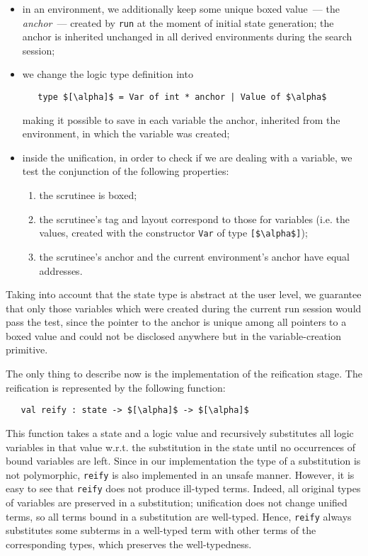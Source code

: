 \begin{itemize}
\item in an environment, we additionally keep some unique boxed value~--- the \emph{anchor}~--- created by \lstinline|run| at the moment of initial
state generation; the anchor is inherited unchanged in all derived environments during the search session;
\item we change the logic type definition into

\begin{lstlisting}
   type $[\alpha]$ = Var of int * anchor | Value of $\alpha$
\end{lstlisting}

\noindent making it possible to save in each variable the anchor, inherited from the environment, in which the variable was created;

\item inside the unification, in order to check if we are dealing with a variable, we test the conjunction of the following properties:

  \begin{enumerate}
    \item the scrutinee is boxed;
    \item the scrutinee's tag and layout correspond to those for variables (i.e. the values, created with the constructor \lstinline|Var| of
type \lstinline{[$\alpha$]});
    \item the scrutinee's anchor and the current environment's anchor have equal addresses.
  \end{enumerate}
\end{itemize}

Taking into account that the state type is abstract at the user level, we guarantee that only those variables which were
created during the current run session would pass the test, since the pointer to the anchor is unique among all pointers to a boxed value
and could not be disclosed anywhere but in the variable-creation primitive.

The only thing to describe now is the implementation of the reification stage. The reification is represented by the following
function:

\begin{lstlisting}
   val reify : state -> $[\alpha]$ -> $[\alpha]$
\end{lstlisting}

This function takes a state and a logic value and recursively substitutes all logic variables in that value w.r.t.
the substitution in the state until no occurrences of bound variables are left. Since in our implementation the type of a substitution is
not polymorphic, \lstinline|reify| is also implemented in an unsafe manner. However, it is easy to see that \lstinline|reify|
does not produce ill-typed terms. Indeed, all original types of variables are preserved in a substitution; unification does not
change unified terms, so all terms bound in a substitution are well-typed. Hence, \lstinline|reify| always substitutes
some subterms in a well-typed term with other terms of the corresponding types, which preserves the well-typedness.

